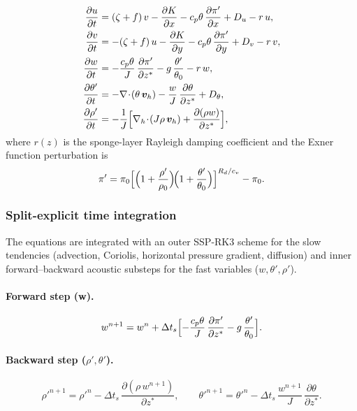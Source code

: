 \documentclass[11pt,a4paper]{article}
\newcommand{\pp}{\partial}
\newcommand{\cpd}{c_p}
\begin{document}
\begin{align}
  \frac{\pp u}{\pp t} &= (\zeta+f)\,v - \frac{\pp K}{\pp x} - \cpd\theta\,\frac{\pp\pi'}{\pp x} + D_u - r\,u, \label{eq:nh-u}\\
  \frac{\pp v}{\pp t} &= -(\zeta+f)\,u - \frac{\pp K}{\pp y} - \cpd\theta\,\frac{\pp\pi'}{\pp y} + D_v - r\,v, \label{eq:nh-v}\\
  \frac{\pp w}{\pp t} &= -\frac{\cpd\theta}{J}\,\frac{\pp\pi'}{\pp z^*} - g\,\frac{\theta'}{\theta_0} - r\,w, \label{eq:nh-w}\\
  \frac{\pp\theta'}{\pp t} &= -\nabla\!\cdot\!(\theta\,\bm v_h) - \frac{w}{J}\,\frac{\pp\theta}{\pp z^*} + D_\theta, \label{eq:nh-theta}\\
  \frac{\pp\rho'}{\pp t} &= -\frac{1}{J}\Bigl[\nabla_h\!\cdot\!(J\rho\,\bm v_h) + \frac{\pp(\rho w)}{\pp z^*}\Bigr], \label{eq:nh-rho}
\end{align}
where $r(z)$ is the sponge-layer Rayleigh damping coefficient and the Exner function perturbation is
\begin{equation}
  \pi' = \pi_0\Bigl[\Bigl(1+\frac{\rho'}{\rho_0}\Bigr)\!\Bigl(1+\frac{\theta'}{\theta_0}\Bigr)\Bigr]^{R_d/c_v}-\pi_0.
\end{equation}

\subsubsection{Split-explicit time integration}

The equations are integrated with an outer SSP-RK3 scheme for the slow tendencies (advection, Coriolis, horizontal pressure gradient, diffusion) and inner forward--backward acoustic substeps for the fast variables ($w,\theta',\rho'$).

\paragraph{Forward step (w).}
\begin{equation}
  w^{n+1} = w^n + \Delta t_s\Bigl[-\frac{\cpd\theta}{J}\,\frac{\pp\pi'}{\pp z^*} - g\,\frac{\theta'}{\theta_0}\Bigr].
\end{equation}

\paragraph{Backward step ($\rho',\theta'$).}
\begin{equation}
  \rho'^{n+1} = \rho'^n - \Delta t_s\,\frac{\pp(\rho\,w^{n+1})}{\pp z^*},
  \qquad
  \theta'^{n+1} = \theta'^n - \Delta t_s\,\frac{w^{n+1}}{J}\,\frac{\pp\theta}{\pp z^*}.
\end{equation}
\end{document}
